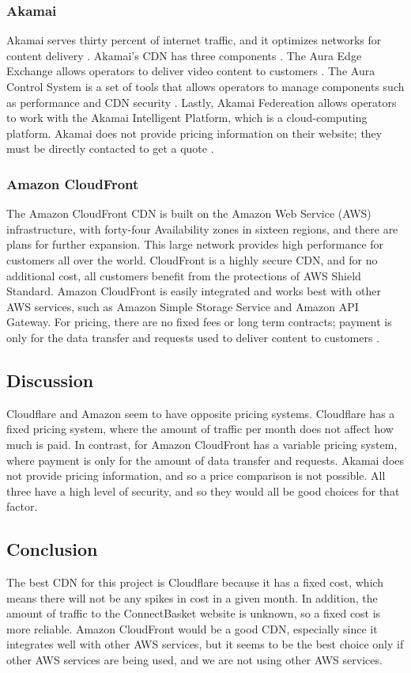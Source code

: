 \documentclass[onecolumn, draftclsnofoot,10pt, compsoc]{IEEEtran}
\begin{document}
\subsubsection{Akamai}
Akamai serves thirty percent of internet traffic, and it optimizes networks for content delivery \cite{akamaicdn}. Akamai's CDN has three components \cite{akamaicdn}. The Aura Edge Exchange allows operators to deliver video content to customers \cite{akamaicdn}. The Aura Control System is a set of tools that allows operators to manage components such as performance and CDN security \cite{akamaicdn}. Lastly, Akamai Federeation allows operators to work with the Akamai Intelligent Platform, which is a cloud-computing platform. Akamai does not provide pricing information on their website; they must be directly contacted to get a quote \cite{akamaicdn}.  

\subsubsection{Amazon CloudFront}
The Amazon CloudFront CDN is built on the Amazon Web Service (AWS) infrastructure, with forty-four Availability zones in sixteen regions, and there are plans for further expansion. This large network provides high performance for customers all over the world. CloudFront is a highly secure CDN, and for no additional cost, all customers benefit from the protections of AWS Shield Standard. Amazon CloudFront is easily integrated and works best with other AWS services, such as Amazon Simple Storage Service and Amazon API Gateway. For pricing, there are no fixed fees or long term contracts; payment is only for the data transfer and requests used to deliver content to customers \cite{amazoncloudfront}.


\subsection{Discussion}
Cloudflare and Amazon seem to have opposite pricing systems. Cloudflare has a fixed pricing system, where the amount of traffic per month does not affect how much is paid. In contrast, for Amazon CloudFront has a variable pricing system, where payment is only for the amount of data transfer and requests. Akamai does not provide pricing information, and so a price comparison is not possible. All three have a high level of security, and so they would all be good choices for that factor.

\subsection{Conclusion}
The best CDN for this project is Cloudflare because it has a fixed cost, which means there will not be any spikes in cost in a given month. In addition, the amount of traffic to the ConnectBasket website is unknown, so a fixed cost is more reliable. Amazon CloudFront would be a good CDN, especially since it integrates well with other AWS services, but it seems to be the best choice only if other AWS services are being used, and we are not using other AWS services.
\end{document}
